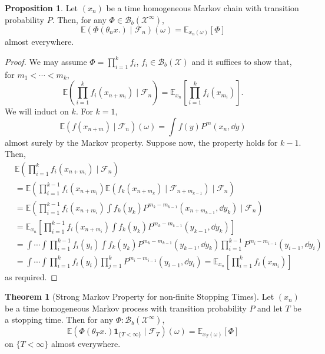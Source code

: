 \documentclass[]{article}
\theoremstyle{definition}
\newtheorem{theorem}{Theorem}
\theoremstyle{definition}
\newtheorem{proposition}{Proposition}[section]
\begin{document}
\begin{proposition}
  Let \((x_n)\) be a time homogeneous Markov chain with transition probability \(P\). 
  Then, for any \(\Phi \in \mathcal{B}_b(\mathcal{X}^\infty)\), 
  \[\mathbb{E}(\Phi(\theta_n x.) \mid \mathcal{F}_n)(\omega) = \mathbb{E}_{x_n(\omega)}[\Phi]\]
  almost everywhere.
\end{proposition}
\begin{proof}
  We may assume \(\Phi = \prod_{i = 1}^k f_i\), \(f_i \in \mathcal{B}_b(\mathcal{X})\)
  and it suffices to show that, for \(m_1 < \cdots < m_k\), 
  \[\mathbb{E}\left(\prod_{i = 1}^k f_i(x_{n + m_i}) \mid \mathcal{F}_n\right) 
    = \mathbb{E}_{x_n}\left[\prod_{i = 1}^k f_i(x_{m_i})\right].\]
  We will induct on \(k\). For \(k = 1\), 
  \[\mathbb{E}(f(x_{n + m}) \mid \mathcal{F}_n)(\omega) = \int f(y) P^m(x_n, \dd y)\]
  almost surely by the Markov property. Suppose now, the property holds for 
  \(k - 1\). Then,
  \[\begin{split}
    & \mathbb{E}\left(\prod_{i = 1}^k f_i(x_{n + m_i}) \mid \mathcal{F}_n\right)\\
    & = \mathbb{E}\left(\prod_{i = 1}^{k - 1} f_i(x_{n + m_i}) \mathbb{E}(f_k(x_{n + m_k}) \mid \mathcal{F}_{n + m_{k - 1}}) \mid \mathcal{F}_n\right)\\
    & = \mathbb{E}\left(\prod_{i = 1}^{k - 1} f_i(x_{n + m_i}) \int f_k(y_k) P^{m_k - m_{k - 1}}(x_{n + m_{k - 1}}, \dd y_k) \mid \mathcal{F}_n\right)\\
    & = \mathbb{E}_{x_n}\left[
      \prod_{i = 1}^{k - 1} f_i(x_{n + m_i})\int f_k(y_k) P^{m_k - m_{k - 1}}(y_{k - 1}, \dd y_k)
    \right]\\
    & = \int \cdots \int \prod_{i = 1}^{k - 1} f_i(y_i) \int f_k(y_k) P^{m_k - m_{k - 1}}(y_{k - 1}, \dd y_k)
      \prod_{i = 1}^{k - 1}P^{m_i - m_{i - 1}}(y_{i - 1}, \dd y_i)\\
    & = \int \cdots \int \prod_{i = 1}^k f_i(y_i) \prod_{j = 1}^k P^{m_i - m_{i - 1}}(y_{i - 1}, \dd y_i)
      = \mathbb{E}_{x_n}\left[\prod_{i = 1}^k f_i(x_{m_i})\right]
  \end{split}\]
  as required.
\end{proof}

\begin{theorem}[Strong Markov Property for non-finite Stopping Times]
  Let \((x_n)\) be a time homogeneous Markov process with transition probability \(P\) 
  and let \(T\) be a stopping time. Then for any \(\Phi : \mathcal{B}_b(\mathcal{X}^\infty)\),
  \[\mathbb{E}(\Phi(\theta_T x.)\mathbf{1}_{\{T < \infty\}} \mid \mathcal{F}_T)(\omega) = 
    \mathbb{E}_{x_T(\omega)}[\Phi]\]
  on \(\{T < \infty\}\) almost everywhere.
\end{theorem}
\end{document}
